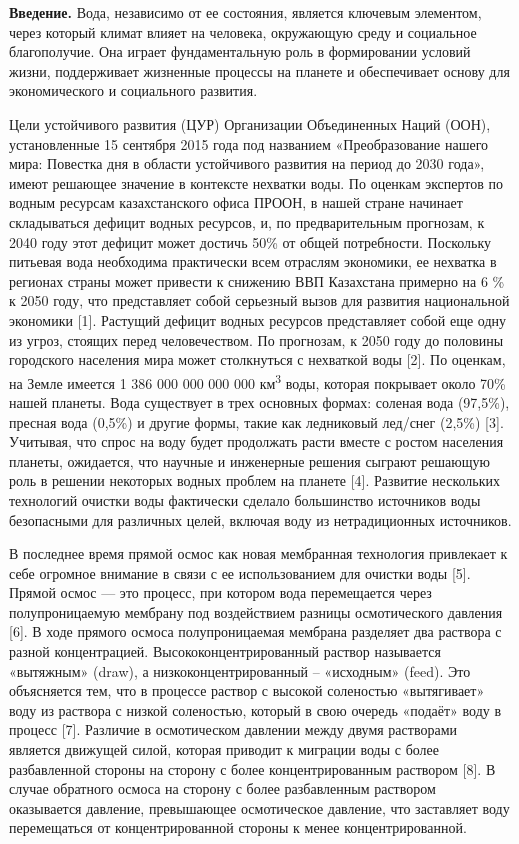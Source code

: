 \begin{multicols}{2}
{\bfseries Введение.} Вода, независимо от ее состояния, является ключевым
элементом, через который климат влияет на человека, окружающую среду и
социальное благополучие. Она играет фундаментальную роль в формировании
условий жизни, поддерживает жизненные процессы на планете и обеспечивает
основу для экономического и социального развития.

Цели устойчивого развития (ЦУР) Организации Объединенных Наций (ООН),
установленные 15 сентября 2015 года под названием «Преобразование нашего
мира: Повестка дня в области устойчивого развития на период до 2030
года», имеют решающее значение в контексте нехватки воды. По оценкам
экспертов по водным ресурсам казахстанского офиса ПРООН, в нашей стране
начинает складываться дефицит водных ресурсов, и, по предварительным
прогнозам, к 2040 году этот дефицит может достичь 50\% от общей
потребности. Поскольку питьевая вода необходима практически всем
отраслям экономики, ее нехватка в регионах страны может привести к
снижению ВВП Казахстана примерно на 6 \% к 2050 году, что представляет
собой серьезный вызов для развития национальной экономики {[}1{]}.
Растущий дефицит водных ресурсов представляет собой еще одну из угроз,
стоящих перед человечеством. По прогнозам, к 2050 году до половины
городского населения мира может столкнуться с нехваткой воды {[}2{]}. По
оценкам, на Земле имеется 1 386 000 000 000 000 км\textsuperscript{3}
воды, которая покрывает около 70\% нашей планеты. Вода существует в трех
основных формах: соленая вода (97,5\%), пресная вода (0,5\%) и другие
формы, такие как ледниковый лед/снег (2,5\%) {[}3{]}. Учитывая, что
спрос на воду будет продолжать расти вместе с ростом населения планеты,
ожидается, что научные и инженерные решения сыграют решающую роль в
решении некоторых водных проблем на планете {[}4{]}. Развитие нескольких
технологий очистки воды фактически сделало большинство источников воды
безопасными для различных целей, включая воду из нетрадиционных
источников.

В последнее время прямой осмос как новая мембранная технология
привлекает к себе огромное внимание в связи с ее использованием для
очистки воды {[}5{]}. Прямой осмос --- это процесс, при котором вода
перемещается через полупроницаемую мембрану под воздействием разницы
осмотического давления {[}6{]}. В ходе прямого осмоса полупроницаемая
мембрана разделяет два раствора с разной концентрацией.
Высококонцентрированный раствор называется «вытяжным» (draw), а
низкоконцентрированный -- «исходным» (feed). Это объясняется тем, что в
процессе раствор с высокой соленостью «вытягивает» воду из раствора с
низкой соленостью, который в свою очередь «подаёт» воду в процесс
{[}7{]}. Различие в осмотическом давлении между двумя растворами
является движущей силой, которая приводит к миграции воды с более
разбавленной стороны на сторону с более концентрированным раствором
{[}8{]}. В случае обратного осмоса на сторону с более разбавленным
раствором оказывается давление, превышающее осмотическое давление, что
заставляет воду перемещаться от концентрированной стороны к менее
концентрированной.


\end{multicols}

